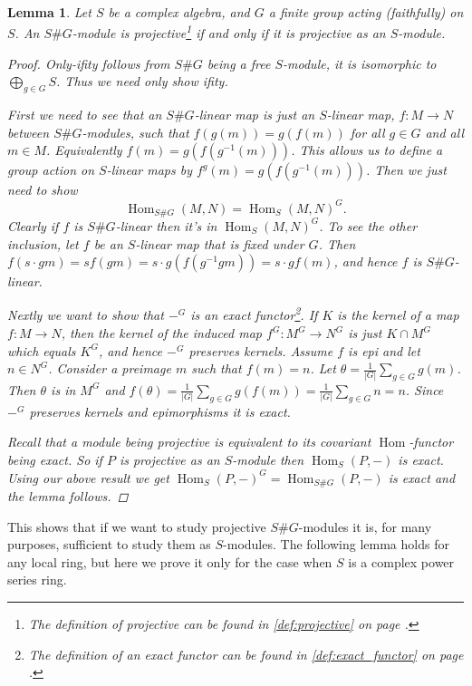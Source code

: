 \documentclass[11pt, a4paper, english]{article}
\newtheorem{lemma}[theorem]{Lemma}
\theoremstyle{definition}
\DeclareMathOperator{\Hom}{Hom}
\begin{document}
\begin{lemma}
\label{lem:S proj => SG proj}
Let $S$ be a complex algebra, and $G$ a finite group acting (faithfully) on $S$. An $S\#G$-module is projective\footnote{The definition of projective can be found in \cref{def:projective} on page \pageref{def:projective}.} if and only if it is projective as an $S$-module.

\begin{proof}
Only-ifity follows from $S\#G$ being a free $S$-module, it is isomorphic to $\bigoplus_{g \in G} S$. Thus we need only show ifity.

First we need to see that an $S\#G$-linear map is just an $S$-linear map, $f: M \to N$ between $S\#G$-modules, such that $f(g(m))=g(f(m))$ for all $g \in G$ and all $m \in M$. Equivalently $f(m) = g(f(g^{-1}(m)))$. This allows us to define a group action on $S$-linear maps by $f^g(m) = g(f(g^{-1}(m)))$. Then we just need to show $$ \Hom_{S\#G}(M,N) = \Hom_S(M,N)^G.$$
Clearly if $f$ is $S\#G$-linear then it's in $\Hom_S(M,N)^G$. To see the other inclusion, let $f$ be an $S$-linear map that is fixed under $G$. Then $f(s\cdot g m) = s f(g m) = s\cdot g(f(g^{-1} g m)) = s \cdot g f(m) $, and hence $f$ is $S\#G$-linear.

Nextly we want to show that $-^G$ is an exact functor\footnote{The definition of an exact functor can be found in \cref{def:exact_functor} on page \pageref{def:exact_functor}.}. If $K$ is the kernel of a map $f: M \to N$, then the kernel of the induced map $f^G : M^G \to N^G$ is just $K \cap M^G$ which equals $K^G$, and hence $-^G$ preserves kernels. Assume $f$ is epi and let $n \in N^G$. Consider a preimage $m$ such that $f(m)=n$. Let $\theta = \frac{1}{|G|}\sum_{g \in G} g(m)$. Then $\theta$ is in $M^G$ and $f(\theta) = \frac{1}{|G|}\sum_{g \in G} g(f(m)) = \frac{1}{|G|}\sum_{g \in G} n = n$. Since $-^G$ preserves kernels and epimorphisms it is exact.

Recall that a module being projective is equivalent to its covariant $\Hom$-functor being exact. So if $P$ is projective as an $S$-module then $\Hom_S(P, -)$ is exact. Using our above result we get $\Hom_S(P, -)^G = \Hom_{S\#G}(P, -)$ is exact and the lemma follows.
\end{proof}
\end{lemma}

This shows that if we want to study projective $S\#G$-modules it is, for many purposes, sufficient to study them as $S$-modules. The following lemma holds for any local ring, but here we prove it only for the case when $S$ is a complex power series ring.
\end{document}
